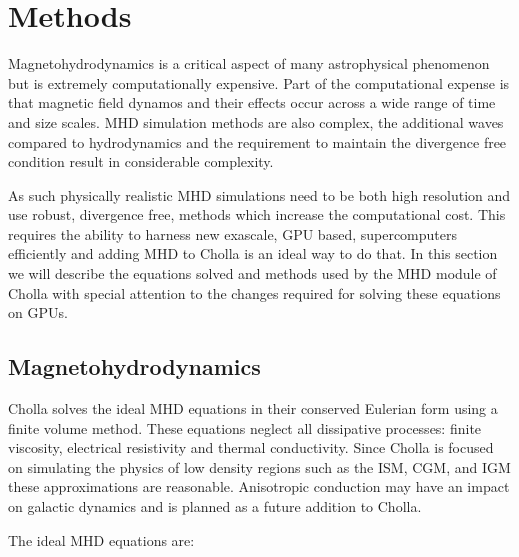 
\section{Methods}
\label{sec:methods}

Magnetohydrodynamics is a critical aspect of many astrophysical phenomenon but is extremely computationally expensive. Part of the computational expense is that magnetic field dynamos and their effects occur across a wide range of time and size scales. MHD simulation methods are also complex, the additional waves compared to hydrodynamics and the requirement to maintain the divergence free condition result in considerable complexity.

As such physically realistic MHD simulations need to be both high resolution and use robust, divergence free, methods which increase the computational cost. This requires the ability to harness new exascale, GPU based, supercomputers efficiently and adding MHD to Cholla is an ideal way to do that. In this section we will describe the equations solved and methods used by the MHD module of Cholla with special attention to the changes required for solving these equations on GPUs.

\subsection{Magnetohydrodynamics}
\label{sec:methods-mhd}

Cholla solves the ideal MHD equations in their conserved Eulerian form using a finite volume method. These equations neglect all dissipative processes: finite viscosity, electrical resistivity and thermal conductivity. Since Cholla is focused on simulating the physics of low density regions such as the ISM, CGM, and IGM these approximations are reasonable. Anisotropic conduction may have an impact on galactic dynamics and is planned as a future addition to Cholla.

The ideal MHD equations are:

